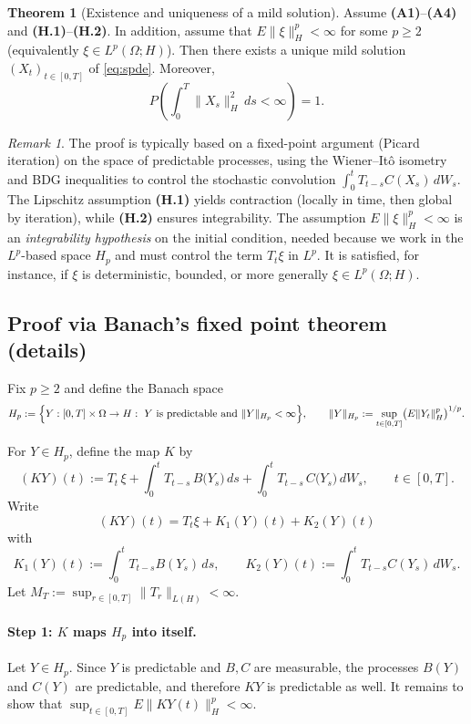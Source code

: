 \documentclass[11pt]{article}
\theoremstyle{definition}
\newtheorem{theorem}{Theorem}
\theoremstyle{remark}
\newtheorem{remark}{Remark}
\begin{document}
\begin{theorem}[Existence and uniqueness of a mild solution]
Assume \textbf{(A1)}--\textbf{(A4)} and \textbf{(H.1)}--\textbf{(H.2)}.  In addition, assume that
$E\|\xi\|_H^p<\infty$ for some $p\ge 2$ (equivalently $\xi\in L^p(\Omega;H)$).
Then there exists a unique mild solution $(X_t)_{t\in[0,T]}$ of \eqref{eq:spde}.
Moreover,
\[
    P\!\left(\int_0^T \|X_s\|_H^2\,ds < \infty\right) = 1.
\]
\end{theorem}

\begin{remark}
The proof is typically based on a fixed-point argument (Picard iteration)
on the space of predictable processes, using the Wiener--It\^o isometry and
BDG inequalities to control the stochastic convolution
$\int_0^t T_{t-s}C(X_s)\,dW_s$.
The Lipschitz assumption \textbf{(H.1)} yields contraction (locally in time,
then global by iteration), while \textbf{(H.2)} ensures integrability.
The assumption $E\|\xi\|_H^p<\infty$ is an \emph{integrability hypothesis} on the initial
condition, needed because we work in the $L^p$-based space $H_p$ and must control
the term $T_t\xi$ in $L^p$.  It is satisfied, for instance, if $\xi$ is deterministic, bounded,
or more generally $\xi\in L^p(\Omega;H)$.
\end{remark}

\subsection*{Proof via Banach's fixed point theorem (details)}

Fix $p\ge 2$ and define the Banach space
\[
    H_p
    :=
    \Bigl\{Y:[0,T]\times\Omega\to H:\ Y\text{ is predictable and }
    \|Y\|_{H_p}<\infty\Bigr\},
    \qquad
    \|Y\|_{H_p}
    :=
    \sup_{t\in[0,T]}\bigl(E\|Y_t\|_H^p\bigr)^{1/p}.
\]

For $Y\in H_p$, define the map $K$ by
\begin{equation}\label{eq:K-map}
    (KY)(t)
    :=
    T_t\,\xi
    +
    \int_0^t T_{t-s}\,B\bigl(Y_s\bigr)\,ds
    +
    \int_0^t T_{t-s}\,C\bigl(Y_s\bigr)\,dW_s,
    \qquad t\in[0,T].
\end{equation}
Write
\[
    (KY)(t) = T_t\xi + K_1(Y)(t) + K_2(Y)(t)
\]
with
\[
    K_1(Y)(t):=\int_0^t T_{t-s}B(Y_s)\,ds,
    \qquad
    K_2(Y)(t):=\int_0^t T_{t-s}C(Y_s)\,dW_s.
\]
Let $M_T:=\sup_{r\in[0,T]}\|T_r\|_{L(H)}<\infty$.

\paragraph{Step 1: $K$ maps $H_p$ into itself.}
Let $Y\in H_p$.  Since $Y$ is predictable and $B,C$ are measurable,
the processes $B(Y)$ and $C(Y)$ are predictable, and therefore
$KY$ is predictable as well.  It remains to show that
$\sup_{t\in[0,T]}E\|KY(t)\|_H^p<\infty$.
\end{document}
